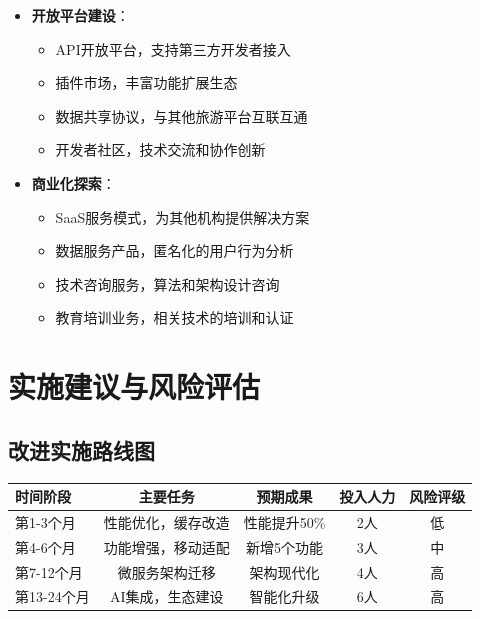 \documentclass[12pt,a4paper]{article}
\begin{document}
\begin{itemize}
    \item \textbf{开放平台建设}：
    \begin{itemize}
        \item API开放平台，支持第三方开发者接入
        \item 插件市场，丰富功能扩展生态
        \item 数据共享协议，与其他旅游平台互联互通
        \item 开发者社区，技术交流和协作创新
    \end{itemize}
    
    \item \textbf{商业化探索}：
    \begin{itemize}
        \item SaaS服务模式，为其他机构提供解决方案
        \item 数据服务产品，匿名化的用户行为分析
        \item 技术咨询服务，算法和架构设计咨询
        \item 教育培训业务，相关技术的培训和认证
    \end{itemize}
\end{itemize}

\section{实施建议与风险评估}

\subsection{改进实施路线图}

\begin{table}[H]
\centering
\begin{tcolorbox}[
    colback=light,
    colframe=primary,
    title={\textbf{改进实施时间表}},
    coltitle=white,
    colbacktitle=primary,
    fonttitle=\bfseries,
    rounded corners=5pt,
    width=0.95\textwidth
]
\begin{tabular}{lcccc}
\toprule
\rowcolor{primary!20}
\textbf{时间阶段} & \textbf{主要任务} & \textbf{预期成果} & \textbf{投入人力} & \textbf{风险评级} \\
\midrule
第1-3个月 & 性能优化，缓存改造 & 性能提升50\% & 2人 & 低 \\
\rowcolor{light}
第4-6个月 & 功能增强，移动适配 & 新增5个功能 & 3人 & 中 \\
第7-12个月 & 微服务架构迁移 & 架构现代化 & 4人 & 高 \\
\rowcolor{light}
第13-24个月 & AI集成，生态建设 & 智能化升级 & 6人 & 高 \\
\bottomrule
\end{tabular}
\end{tcolorbox}
\end{table}
\end{document}
